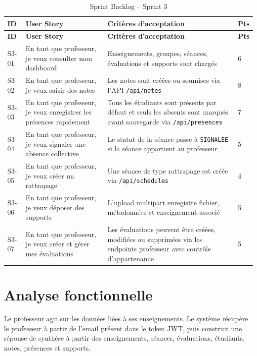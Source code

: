 \documentclass[12pt,a4paper]{report}
\begin{document}
\begin{longtable}{|p{1.6cm}|p{6cm}|p{5.6cm}|p{1.4cm}|}
\caption{Sprint Backlog -- Sprint 3}\\
\hline
\textbf{ID} & \textbf{User Story} & \textbf{Critères d'acceptation} & \textbf{Pts} \\
\hline
\endfirsthead
\hline
\textbf{ID} & \textbf{User Story} & \textbf{Critères d'acceptation} & \textbf{Pts} \\
\hline
\endhead
S3-01 & En tant que professeur, je veux consulter mon dashboard & Enseignements, groupes, séances, évaluations et supports sont chargés & 6 \\
\hline
S3-02 & En tant que professeur, je veux saisir des notes & Les notes sont créées ou soumises via l'API \texttt{/api/notes} & 8 \\
\hline
S3-03 & En tant que professeur, je veux enregistrer les présences rapidement & Tous les étudiants sont présents par défaut et seuls les absents sont marqués avant sauvegarde via \texttt{/api/presences} & 7 \\
\hline
S3-04 & En tant que professeur, je veux signaler une absence collective & Le statut de la séance passe à \texttt{SIGNALEE} si la séance appartient au professeur & 5 \\
\hline
S3-05 & En tant que professeur, je veux créer un rattrapage & Une séance de type rattrapage est créée via \texttt{/api/schedules} & 4 \\
\hline
S3-06 & En tant que professeur, je veux déposer des supports & L'upload multipart enregistre fichier, métadonnées et enseignement associé & 5 \\
\hline
S3-07 & En tant que professeur, je veux créer et gérer mes évaluations & Les évaluations peuvent être créées, modifiées ou supprimées via les endpoints professeur avec contrôle d'appartenance & 5 \\
\hline
\end{longtable}

\section{Analyse fonctionnelle}

Le professeur agit sur les données liées à ses enseignements. Le système récupère le professeur à partir de l'email présent dans le token JWT, puis construit une réponse de synthèse à partir des enseignements, séances, évaluations, étudiants, notes, présences et supports.
\end{document}

